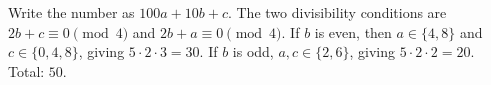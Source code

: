 Write the number as $100a+10b+c$. The two divisibility conditions are $2b+c\equiv0\pmod4$ and $2b+a\equiv0\pmod4$. If $b$ is even, then $a\in\{4,8\}$ and $c\in\{0,4,8\}$, giving $5\cdot2\cdot3=30$. If $b$ is odd, $a,c\in\{2,6\}$, giving $5\cdot2\cdot2=20$. Total: $\boxed{50}$.
